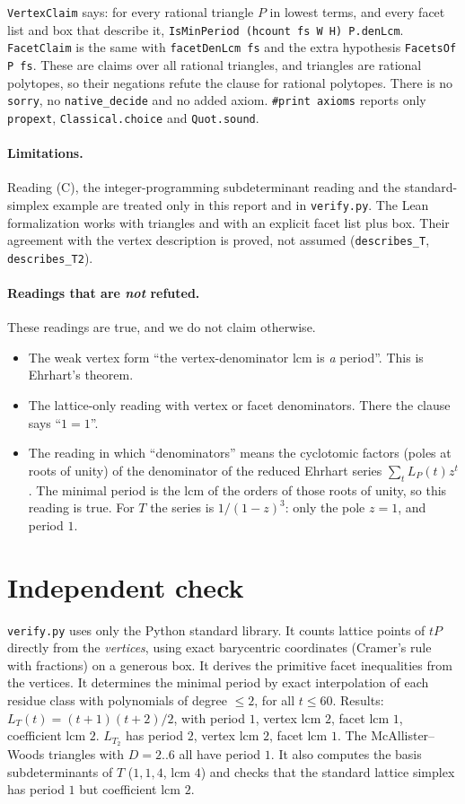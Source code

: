 \documentclass[11pt]{article}
\theoremstyle{definition}
\theoremstyle{remark}
\begin{document}
\texttt{VertexClaim} says: for every rational triangle $P$ in lowest terms, and every facet list and
box that describe it, \texttt{IsMinPeriod (hcount fs W H) P.denLcm}. \texttt{FacetClaim} is the same
with \texttt{facetDenLcm fs} and the extra hypothesis \texttt{FacetsOf P fs}. These are claims over
all rational triangles, and triangles are rational polytopes, so their negations refute the
clause for rational polytopes. There is no \texttt{sorry}, no \texttt{native\_decide} and no added axiom.
\texttt{\#print axioms} reports only \texttt{propext}, \texttt{Classical.choice} and
\texttt{Quot.sound}.

\paragraph{Limitations.} Reading (C), the integer-programming subdeterminant reading and the
standard-simplex example are treated only in this report and in \texttt{verify.py}. The Lean
formalization works with triangles and with an explicit facet list plus box. Their
agreement with the vertex description is proved, not assumed (\texttt{describes\_T},
\texttt{describes\_T2}).

\paragraph{Readings that are \emph{not} refuted.} These readings are true, and we do not claim otherwise.
\begin{itemize}
\item The weak vertex form ``the vertex-denominator lcm is \emph{a} period''. This is Ehrhart's
theorem.
\item The lattice-only reading with vertex or facet denominators. There the clause says ``$1=1$''.
\item The reading in which ``denominators'' means the cyclotomic factors (poles at roots of unity) of
the denominator of the reduced Ehrhart series $\sum_t L_P(t)z^t$. The minimal period is the lcm of
the orders of those roots of unity, so this reading is true. For $T$ the series is $1/(1-z)^3$:
only the pole $z=1$, and period $1$.
\end{itemize}

\section{Independent check}

\texttt{verify.py} uses only the Python standard library. It counts lattice points of $tP$ directly
from the \emph{vertices}, using exact barycentric coordinates (Cramer's rule with fractions) on a
generous box. It derives the primitive facet inequalities from the vertices. It determines the
minimal period by exact interpolation of each residue class with polynomials of degree $\le2$, for
all $t\le60$. Results: $L_T(t)=(t+1)(t+2)/2$, with period $1$, vertex lcm $2$, facet lcm $1$, coefficient lcm
$2$. $L_{T_2}$ has period $2$, vertex lcm $2$, facet lcm $1$. The McAllister--Woods triangles with $D=2..6$
all have period $1$. It also computes the basis subdeterminants of $T$ ($1,1,4$, lcm $4$) and checks
that the standard lattice simplex has period $1$ but coefficient lcm $2$.
\end{document}
